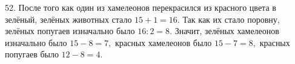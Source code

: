 52. После того как один из хамелеонов перекрасился из красного цвета в зелёный, зелёных животных стало $15+1=16.$ Так как их стало поровну, зелёных попугаев изначально было $16:2=8.$ Значит, зелёных хамелеонов изначально было $15-8=7,$ красных хамелеонов было $15-7=8,$ красных попугаев было $12-8=4.$\\
